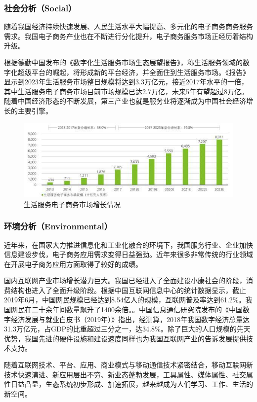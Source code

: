 \documentclass[UTF8,12pt]{ctexart}
\numberwithin{figure}{section}%
\begin{document}
\begin{spacing}{2}
\subsubsection{社会分析（Social）}
随着我国经济持续快速发展、人民生活水平大幅提高、多元化的电子商务商务服务需求。我国电子商务产业也在不断进行分化提升，电子商务服务市场正经历着结构升级。

根据德勤中国发布的《数字化生活服务市场生态展望报告》，称生活服务领域的数字化超级平台的崛起，将形成新的平台经济，并全面住到生活服务市场。《报告》显示到2023年生活服务市场整日规模将达到3.3万亿元，接近2017年水平的一倍，其中生活服务电子商务市场目前市场规模已达2.7万亿，未来5年有望超过8万亿。随着中国经济形态的不断发展，第三产业也就是服务业将逐渐成为中国社会经济增长的主要引擎。

\begin{figure}[!htb]
	\centering
	\includegraphics[width=14cm]{fig/3}
	\caption{生活服务电子商务市场增长情况}
\end{figure}

\subsubsection{环境分析（Environmental）}
近年来，在国家大力推进信息化和工业化融合的环境下，我国服务行业、企业加快信息建设步伐，电子商务应用需求变得日益强劲。近年来很多非常传统的行业领域在开展电子商务应用方面取得了较好的成绩。

国内互联网产业市场增长潜力巨大。我国已经进入了全面建设小康社会的阶段，消费结构也进入了全面升级阶段。根据中国互联网信息中心的统计数据显示，截止2019年6月，中国网民规模已经达到8.54亿人的规模，互联网普及率达到61.2\%。我国网民在二十余年间数量飙升了1400余倍。。中国信息通信研究院发布的《中国数字经济发展与就业白皮书（2019年）》指出，经测算，2018年我国数字经济总量达31.3万亿元，占GDP的比重超过三分之一，达34.8\%。除了巨大的人口规模的先天优势，我国先进的硬件设施和建设速度同样也为我国互联网产业的告诉发展提供技术支持。

随着互联网技术、平台、应用、商业模式与移动通信技术紧密结合，移动互联网新技术快速演进、新应用层出不穷、新业态蓬勃发展，工具属性、媒体属性、社交属性日益凸显，生态系统初步形成、加速拓展，越来越成为人们学习、工作、生活的新空间。


\end{spacing}
\end{document}
